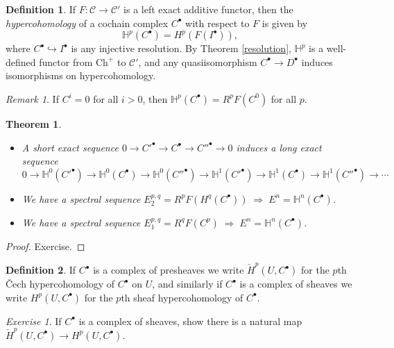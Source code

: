 \documentclass[letterpaper,11pt]{article}
\newtheorem{thm}{Theorem}
\theoremstyle{definition}
\newtheorem{defn}{Definition}
\theoremstyle{remark}
\newtheorem{rmk}{Remark}
\newtheorem{exer}{Exercise}
\begin{document}
\begin{defn} If $F : \mathcal{C} \rightarrow \mathcal{C}'$ is a left exact additive functor, then the \emph{hypercohomology} of a cochain complex $C^\bullet$ with respect to $F$ is given by
\[
\mathbb{H}^p(C^\bullet) = H^p(F(I^\bullet)),
\]
where $C^\bullet \hookrightarrow I^\bullet$ is any injective resolution. By Theorem \ref{resolution}, $\mathbb{H}^p$ is a well-defined functor from $\mbox{Ch}^+$ to $\mathcal{C}'$, and any quasiisomorphism $C^\bullet \rightarrow D^\bullet$ induces isomorphisms on hypercohomology.
\end{defn}

\begin{rmk} If $C^i = 0$ for all $i > 0$, then $\mathbb{H}^p(C^\bullet) = R^pF(C^0)$ for all $p$.
\end{rmk}

\begin{thm}
\begin{itemize}
\item[{\rm (a)}] A short exact sequence $0 \rightarrow C'^\bullet \rightarrow C^\bullet \rightarrow C''^\bullet \rightarrow 0$ induces a long exact sequence
\[
0 \rightarrow \mathbb{H}^0(C'^\bullet) \rightarrow \mathbb{H}^0(C^\bullet) \rightarrow \mathbb{H}^0(C''^\bullet) \rightarrow \mathbb{H}^1(C'^\bullet) \rightarrow \mathbb{H}^1(C^\bullet) \rightarrow \mathbb{H}^1(C''^\bullet) \rightarrow \cdots
\]

\item[{\rm (b)}] We have a spectral sequence $E^{p,q}_2 = R^pF(H^q(C^\bullet))\;\Rightarrow\;E^n = \mathbb{H}^n(C^\bullet)$.

\item[{\rm (c)}] We have a spectral sequence $E^{p,q}_1 = R^qF(C^p)\;\Rightarrow\;E^n = \mathbb{H}^n(C^\bullet)$.
\end{itemize}
\end{thm}
\begin{proof} Exercise.
\end{proof}

\begin{defn} If $C^\bullet$ is a complex of presheaves we write $\check{H}^p(U,C^\bullet)$ for the $p$th \v{C}ech hypercohomology of $C^\bullet$ on $U$, and similarly if $C^\bullet$ is a complex of sheaves we write $H^p(U,C^\bullet)$ for the $p$th sheaf hypercohomology of $C^\bullet$.
\end{defn}

\begin{exer} If $C^\bullet$ is a complex of sheaves, show there is a natural map $\check{H}^p(U,C^\bullet) \rightarrow H^p(U,C^\bullet)$.
\end{exer}
\end{document}
